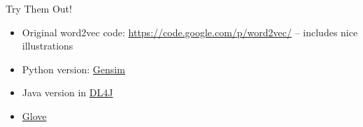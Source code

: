 \documentclass[xcolor=pdftex,x11names,table,hyperref]{beamer}
\begin{document}
\begin{frame}{Try Them Out!}
\begin{itemize}
	\item Original word2vec code: \url{https://code.google.com/p/word2vec/} -- includes nice illustrations
	\item Python version: \href{http://radimrehurek.com/gensim}{Gensim}
	\item Java version in \href{http://deeplearning4j.org/word2vec.html}{DL4J}
	\item \href{http://nlp.stanford.edu/projects/glove}{Glove}
\end{itemize}
\end{frame}





\end{document}
